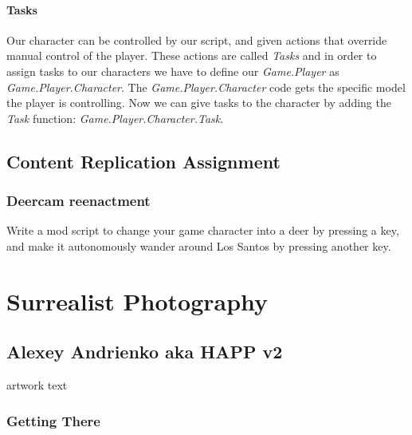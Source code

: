 \documentclass[
  openany]{book}
\begin{document}
\hypertarget{tasks}{%
\subsubsection*{Tasks}\label{tasks}}

Our character can be controlled by our script, and given actions that override manual control of the player. These actions are called \emph{Tasks} and in order to assign tasks to our characters we have to define our \emph{Game.Player} as \emph{Game.Player.Character}. The \emph{Game.Player.Character} code gets the specific model the player is controlling.
Now we can give tasks to the character by adding the \emph{Task} function: \emph{Game.Player.Character.Task}.

\hypertarget{content-replication-assignment-3}{%
\section*{Content Replication Assignment}\label{content-replication-assignment-3}}

\hypertarget{deercam-reenactment}{%
\subsection*{Deercam reenactment}\label{deercam-reenactment}}

Write a mod script to change your game character into a deer by pressing a key, and make it autonomously wander around Los Santos by pressing another key.

\hypertarget{surrealist-photography}{%
\chapter{Surrealist Photography}\label{surrealist-photography}}

\hypertarget{alexey-andrienko-aka-happ-v2}{%
\section*{Alexey Andrienko aka HAPP v2}\label{alexey-andrienko-aka-happ-v2}}

artwork text

\hypertarget{getting-there-7}{%
\subsection*{Getting There}\label{getting-there-7}}
\end{document}
